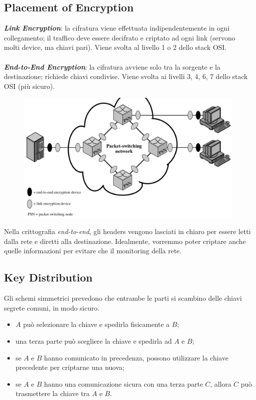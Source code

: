 \documentclass[11pt, a4paper, twoside, italian]{report}
\theoremstyle{plain}
\begin{document}
\subsection*{Placement of Encryption}
\begin{multicols}{2}
	\noindent
\textit{\textbf{Link Encryption}}: la cifratura viene effettuata indipendentemente in ogni collegamento; il traffico deve essere decifrato e criptato ad ogni link (servono molti device, ma chiavi pari). Viene svolta al livello 1 o 2 dello stack OSI.
\\\\
\textit{\textbf{End-to-End Encryption}}: la cifratura avviene solo tra la sorgente e la destinazione; richiede chiavi condivise. Viene svolta ai livelli 3, 4, 6, 7 dello stack OSI (più sicuro).
\columnbreak
\begin{figure}[H]
	\centering
	\includegraphics[scale=0.32]{eteenc}
\end{figure}
\end{multicols}
\noindent
Nella crittografia \textit{end-to-end}, gli headers vengono lasciati in chiaro per essere letti dalla rete e diretti alla destinazione. Idealmente, vorremmo poter criptare anche quelle informazioni per evitare che il monitoring della rete.


\subsection*{Key Distribution}
Gli schemi simmetrici prevedono che entrambe le parti si scambino delle chiavi segrete comuni, in modo sicuro.
\begin{itemize}
	\item $A$ può selezionare la chiave e spedirla fisicamente a $B$;
	\item una terza parte può scegliere la chiave e spedirla ad $A$ e $B$;
	\item se $A$ e $B$ hanno comunicato in precedenza, possono utilizzare la chiave precedente per criptarne una nuova;
	\item se $A$ e $B$ hanno una comunicazione sicura con una terza parte $C$, allora $C$ può trasmettere la chiave tra $A$ e $B$.
	\newline
\end{itemize}
\end{document}

